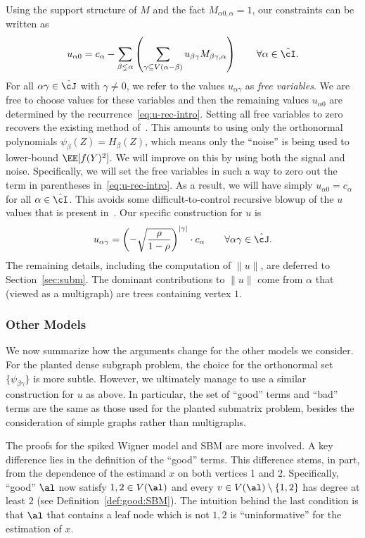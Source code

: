 \documentclass[11pt]{article}
\begin{document}
Using the support structure of $M$ and the fact $M_{\alpha 0,\alpha} = 1$, our constraints can be written as
\begin{equation}\label{eq:u-rec-intro}
u_{\alpha 0} = c_\alpha - \sum_{\beta \lneq \alpha} \left( \sum_{\gamma \subseteq V(\alpha-\beta)} u_{\beta\gamma} M_{\beta\gamma,\alpha}\right) \qquad \forall \alpha \in \hat\cI.
\end{equation}
For all $\alpha\gamma \in \hat\cJ$ with $\gamma \ne 0$, we refer to the values $u_{\alpha\gamma}$ as \emph{free variables}. We are free to choose values for these variables and then the remaining values $u_{\alpha 0}$ are determined by the recurrence~\eqref{eq:u-rec-intro}. Setting all free variables to zero recovers the existing method of~\cite{SW-estimation}. This amounts to using only the orthonormal polynomials $\psi_\beta(Z) = H_\beta(Z)$, which means only the ``noise'' is being used to lower-bound $\EE[f(Y)^2]$. We will improve on this by using both the signal and noise. Specifically, we will set the free variables in such a way to zero out the term in parentheses in~\eqref{eq:u-rec-intro}. As a result, we will have simply $u_{\alpha 0} = c_\alpha$ for all $\alpha \in \hat\cI$. This avoids some difficult-to-control recursive blowup of the $u$ values that is present in~\cite{SW-estimation}. Our specific construction for $u$ is
\[ u_{\alpha\gamma} = \left(-\sqrt{\frac{\rho}{1-\rho}}\right)^{|\gamma|} \cdot c_\alpha \qquad \forall \alpha\gamma \in \hat\cJ. \]
The remaining details, including the computation of $\|u\|$, are deferred to Section~\ref{sec:subm}. The dominant contributions to $\|u\|$ come from $\alpha$ that (viewed as a multigraph) are trees containing vertex $1$.


\subsubsection{Other Models}
\label{subsec:other}
We now summarize how the arguments change for the other models we consider. For the planted dense subgraph problem, the choice for the orthonormal set $\{\psi_{\beta\gamma}\}$ is more subtle. However, we ultimately manage to use a similar construction for $u$ as above. In particular, the set of ``good'' terms and ``bad'' terms are the same as those used for the planted submatrix problem, besides the consideration of simple graphs rather than multigraphs.

The proofs for the spiked Wigner model and SBM are more involved. A key difference lies in the definition of the ``good'' terms. This difference stems, in part, from the dependence of the estimand $x$ on both vertices 1 and 2. Specifically, ``good'' $\al$ now satisfy $1,2\in V(\al)$ and every $v\in V(\al)\setminus \{1,2\}$ has degree at least $2$ (see Definition~\ref{def:good:SBM}). The intuition behind the last condition is that $\al$ that contains a leaf node which is not $1,2$ is ``uninformative'' for the estimation of $x$.
\end{document}
